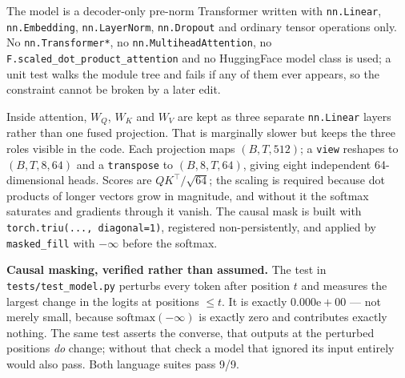 \documentclass[10pt]{article}
\begin{document}
The model is a decoder-only pre-norm Transformer written with
\texttt{nn.Linear}, \texttt{nn.Embedding}, \texttt{nn.LayerNorm},
\texttt{nn.Dropout} and ordinary tensor operations only. No
\texttt{nn.Transformer*}, no \texttt{nn.MultiheadAttention}, no
\texttt{F.scaled\_dot\_product\_attention} and no HuggingFace model class is used;
a unit test walks the module tree and fails if any of them ever appears, so the
constraint cannot be broken by a later edit.

Inside attention, $W_Q$, $W_K$ and $W_V$ are kept as three separate
\texttt{nn.Linear} layers rather than one fused projection. That is marginally
slower but keeps the three roles visible in the code. Each projection maps
$(B,T,512)$; a \texttt{view} reshapes to $(B,T,8,64)$ and a \texttt{transpose} to
$(B,8,T,64)$, giving eight independent 64-dimensional heads. Scores are
$QK^{\top}/\sqrt{64}$; the scaling is required because dot products of longer vectors
grow in magnitude, and without it the softmax saturates and gradients through it
vanish. The causal mask is built with \texttt{torch.triu(..., diagonal=1)},
registered non-persistently, and applied by \texttt{masked\_fill} with $-\infty$
before the softmax.

\textbf{Causal masking, verified rather than assumed.} The test in
\texttt{tests/test\_model.py} perturbs every token after position $t$ and measures
the largest change in the logits at positions $\le t$. It is exactly
$0.000\mathrm{e}{+}00$ --- not merely small, because $\mathrm{softmax}(-\infty)$ is
exactly zero and contributes exactly nothing. The same test asserts the converse,
that outputs at the perturbed positions \emph{do} change; without that check a model
that ignored its input entirely would also pass. Both language suites pass 9/9.
\end{document}
